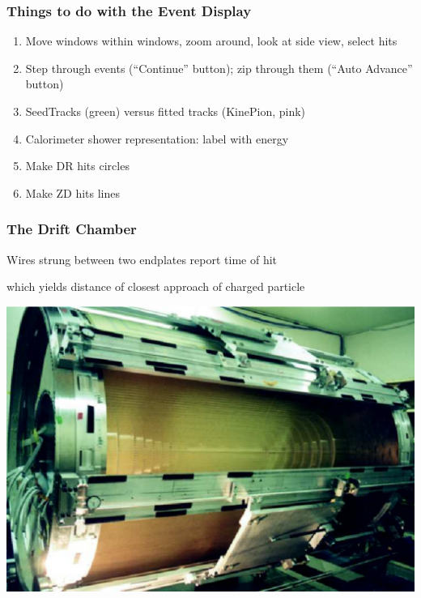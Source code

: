\documentclass[12pt,compress]{beamer}
\begin{document}
\begin{frame}
\frametitle{Things to do with the Event Display}
\begin{enumerate}\setlength{\itemsep}{0.4 cm}
\item Move windows within windows, zoom around, look at side view, select hits
\item Step through events (``Continue'' button); zip through them (``Auto Advance'' button)
\item SeedTracks (green) versus fitted tracks (KinePion, pink)
\item \label{showersarelabeled} Calorimeter shower representation: label with energy
\item \label{hitsarecircles} Make DR hits circles
\item \label{hitsarelines} Make ZD hits lines
\end{enumerate}
\end{frame}

\begin{frame}
\frametitle{The Drift Chamber} Wires strung between two endplates
report time of hit

which yields distance of closest approach of charged particle

\begin{center}
\includegraphics[width=0.9\linewidth]{cleo_dr}
\end{center}
\end{frame}
\end{document}
